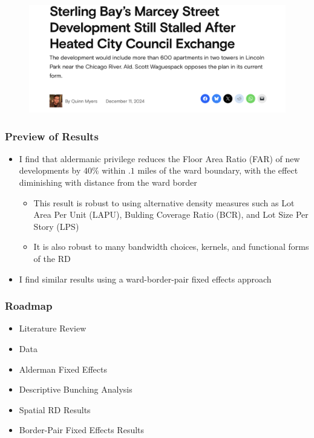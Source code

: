 \begin{frame}
\begin{minipage}{0.48\textwidth}
\begin{figure}
		\end{figure}
		\begin{figure}
			\centering
			\includegraphics[width=\textwidth]{images/sterling_bay_fight.png}
        \end{figure}
        \end{minipage}
\end{frame}

\begin{frame}
	\frametitle{Preview of Results}
	\begin{itemize}
		\item I find that aldermanic privilege reduces the Floor Area Ratio (FAR) of new developments by $40\%$ within $.1$ miles of the ward boundary, with the effect diminishing with distance from the ward border
		\begin{itemize}
			\item This result is robust to using alternative density measures such as Lot Area Per Unit (LAPU), Bulding Coverage Ratio (BCR), and Lot Size Per Story (LPS)
			\item It is also robust to many bandwidth choices, kernels, and functional forms of the RD
		\end{itemize}
		\item I find similar results using a ward-border-pair fixed effects approach 
	\end{itemize}
\end{frame}

\begin{frame}
	\frametitle{Roadmap}
	\begin{itemize}
		\item Literature Review
		\item Data 
		\item Alderman Fixed Effects
		\item Descriptive Bunching Analysis
		\item Spatial RD Results
		\item Border-Pair Fixed Effects Results
	\end{itemize}
\end{frame}